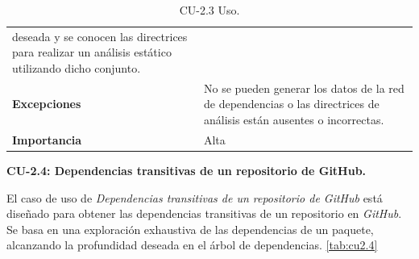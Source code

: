 \begin{table}[p]
\begin{tabularx}{\linewidth}{ p{} p{} }
		deseada y se conocen las directrices para realizar un análisis estático utilizando dicho
		conjunto.                                                                                                                                  \\
		\textbf{Excepciones}          & No se pueden generar los datos de la red de dependencias o las
		directrices de análisis están ausentes o incorrectas.                                                                                      \\
		\textbf{Importancia}          & Alta                                                                                                       \\
		\bottomrule
	\end{tabularx}
	\caption{CU-2.3 Uso.}
	\label{tab:cu2.3}
\end{table}

\textbf{CU-2.4: Dependencias transitivas de un repositorio de GitHub.}

El caso de uso de \textit{Dependencias transitivas de un repositorio de GitHub} está diseñado para obtener las dependencias transitivas de un repositorio
en \textit{GitHub}. Se basa en una exploración exhaustiva de las dependencias de un paquete,
alcanzando la profundidad deseada en el árbol de dependencias. \ref{tab:cu2.4}

